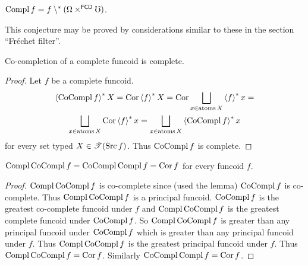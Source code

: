 \begin{conjecture}
$\operatorname{Compl} f=f\setminus^{\ast}(\Omega\times^{\mathsf{FCD}}\mho)$.
\end{conjecture}
This conjecture may be proved by considerations similar to these in
the section ``Fr\'echet filter''.
\begin{lem}
Co-completion of a complete funcoid is complete.\end{lem}
\begin{proof}
Let $f$ be a complete funcoid.
\begin{multline*}
\rsupfun{\CoCompl f}X=\Cor\rsupfun fX=\Cor\bigsqcup_{x\in\atoms X}\rsupfun fx=\\
\bigsqcup_{x\in\atoms X}\Cor\rsupfun fx=\bigsqcup_{x\in\atoms
X}\rsupfun{\CoCompl f}x
\end{multline*}
for every set typed $X\in\mathscr{T}(\operatorname{Src} f)$. Thus $\operatorname{CoCompl} f$
is complete.\end{proof}
\begin{thm}
$\operatorname{Compl}\operatorname{CoCompl} f=\operatorname{CoCompl}\operatorname{Compl} f=\operatorname{Cor} f$ for every funcoid $f$.\end{thm}
\begin{proof}
$\operatorname{Compl}\operatorname{CoCompl} f$ is co-complete since (used the lemma) $\operatorname{CoCompl} f$
is co-complete. Thus $\operatorname{Compl}\operatorname{CoCompl} f$ is a principal funcoid. $\operatorname{CoCompl} f$
is the greatest co-complete funcoid under $f$ and $\operatorname{Compl}\operatorname{CoCompl} f$
is the greatest complete funcoid under $\operatorname{CoCompl} f$. So $\operatorname{Compl}\operatorname{CoCompl} f$
is greater than any principal funcoid under $\operatorname{CoCompl} f$ which is
greater than any principal funcoid under $f$. Thus $\operatorname{Compl}\operatorname{CoCompl} f$
is the greatest principal funcoid under $f$. Thus $\operatorname{Compl}\operatorname{CoCompl} f=\operatorname{Cor} f$.
Similarly $\operatorname{CoCompl}\operatorname{Compl} f=\operatorname{Cor} f$.
\end{proof}

